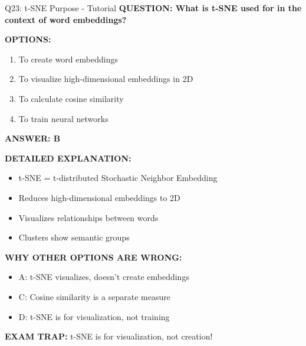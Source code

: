 \documentclass[8pt]{beamer}
\begin{document}
	\begin{frame}{Q23: t-SNE Purpose - Tutorial}
		\fontsize{6.5}{7.5}\selectfont
		\textbf{QUESTION: What is t-SNE used for in the context of word embeddings?}
		
		\vspace{0.1cm}
		\textbf{OPTIONS:}
		\begin{enumerate}
			\item To create word embeddings
			\item To visualize high-dimensional embeddings in 2D
			\item To calculate cosine similarity
			\item To train neural networks
		\end{enumerate}
		
		\vspace{0.1cm}
		\textcolor{myblue}{\textbf{ANSWER: B}}
		
		\vspace{0.1cm}
		\textbf{DETAILED EXPLANATION:}
		\begin{itemize}
			\item t-SNE = t-distributed Stochastic Neighbor Embedding
			\item Reduces high-dimensional embeddings to 2D
			\item Visualizes relationships between words
			\item Clusters show semantic groups
		\end{itemize}
		
		\vspace{0.1cm}
		\textcolor{myred}{\textbf{WHY OTHER OPTIONS ARE WRONG:}}
		\begin{itemize}
			\item \textcolor{myred}{A:} t-SNE visualizes, doesn't create embeddings
			\item \textcolor{myred}{C:} Cosine similarity is a separate measure
			\item \textcolor{myred}{D:} t-SNE is for visualization, not training
		\end{itemize}
		
		\textcolor{myred}{\textbf{EXAM TRAP:}} t-SNE is for \textcolor{myblue}{visualization}, not creation!
	\end{frame}
	
\end{document}
